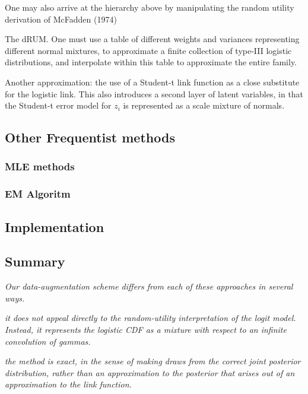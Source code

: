 \documentclass[12pt]{article}
\begin{document}
One may also arrive at the hierarchy above by manipulating the random
utility derivation of McFadden (1974)

The dRUM. One must use a table of different weights and variances
representing different normal mixtures, to approximate a finite
collection of type-III logistic distributions, and interpolate within
this table to approximate the entire family.

Another approximation: the use of a Student-t link function as a close
substitute for the logistic link. This also introduces a second layer of
latent variables, in that the Student-t error model for \(z_i\) is
represented as a scale mixture of normals.

\hypertarget{other-frequentist-methods}{%
\subsection{Other Frequentist methods}\label{other-frequentist-methods}}

\hypertarget{mle-methods}{%
\subsubsection{MLE methods}\label{mle-methods}}

\hypertarget{em-algoritm}{%
\subsubsection{EM Algoritm}\label{em-algoritm}}

\hypertarget{implementation}{%
\subsection{Implementation}\label{implementation}}

\hypertarget{summary}{%
\subsection{Summary}\label{summary}}

\emph{Our data-augmentation scheme differs from each of these approaches
in several ways.}

\emph{it does not appeal directly to the random-utility interpretation
of the logit model. Instead, it represents the logistic CDF as a mixture
with respect to an infinite convolution of gammas.}

\emph{the method is exact, in the sense of making draws from the correct
joint posterior distribution, rather than an approximation to the
posterior that arises out of an approximation to the link function.}
\end{document}
